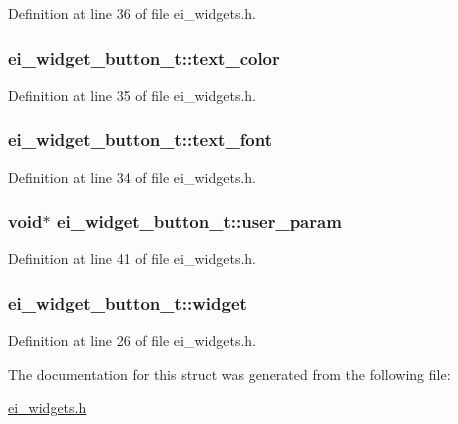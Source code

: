 Definition at line 36 of file ei\-\_\-widgets.\-h.

\hypertarget{structei__widget__button__t_a938724ea59ccdfbcbada1b237ad14640}{
\subsubsection[{text\-\_\-color}]{ ei\-\_\-widget\-\_\-button\-\_\-t\-::text\-\_\-color}}\label{structei__widget__button__t_a938724ea59ccdfbcbada1b237ad14640}


Definition at line 35 of file ei\-\_\-widgets.\-h.

\hypertarget{structei__widget__button__t_ad619e741a38f68fda98a9c9405225123}{
\subsubsection[{text\-\_\-font}]{ ei\-\_\-widget\-\_\-button\-\_\-t\-::text\-\_\-font}}\label{structei__widget__button__t_ad619e741a38f68fda98a9c9405225123}


Definition at line 34 of file ei\-\_\-widgets.\-h.

\hypertarget{structei__widget__button__t_a77f0c278c449eb8e90f6a7f8415ac882}{
\subsubsection[{user\-\_\-param}]{\setlength{\rightskip}{0pt plus 5cm}void$\ast$ ei\-\_\-widget\-\_\-button\-\_\-t\-::user\-\_\-param}}\label{structei__widget__button__t_a77f0c278c449eb8e90f6a7f8415ac882}


Definition at line 41 of file ei\-\_\-widgets.\-h.

\hypertarget{structei__widget__button__t_acf769e84e4a3cd0201c019998850deef}{
\subsubsection[{widget}]{ ei\-\_\-widget\-\_\-button\-\_\-t\-::widget}}\label{structei__widget__button__t_acf769e84e4a3cd0201c019998850deef}


Definition at line 26 of file ei\-\_\-widgets.\-h.



The documentation for this struct was generated from the following file\-:\begin{DoxyCompactItemize}
\item 
\hyperlink{ei__widgets_8h}{ei\-\_\-widgets.\-h}\end{DoxyCompactItemize}
